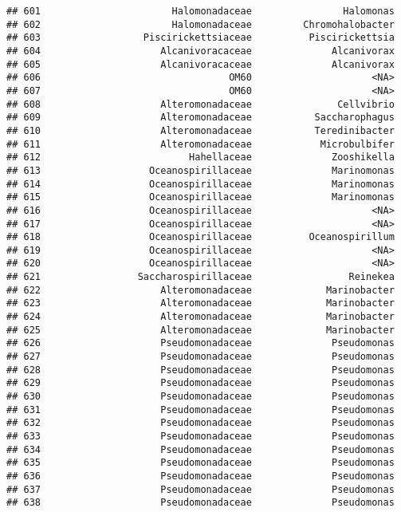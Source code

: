 \documentclass[
]{article}
\begin{document}
\begin{verbatim}
## 601                       Halomonadaceae                Halomonas
## 602                       Halomonadaceae         Chromohalobacter
## 603                  Piscirickettsiaceae          Piscirickettsia
## 604                     Alcanivoracaceae              Alcanivorax
## 605                     Alcanivoracaceae              Alcanivorax
## 606                                 OM60                     <NA>
## 607                                 OM60                     <NA>
## 608                     Alteromonadaceae               Cellvibrio
## 609                     Alteromonadaceae           Saccharophagus
## 610                     Alteromonadaceae           Teredinibacter
## 611                     Alteromonadaceae            Microbulbifer
## 612                          Hahellaceae              Zooshikella
## 613                   Oceanospirillaceae              Marinomonas
## 614                   Oceanospirillaceae              Marinomonas
## 615                   Oceanospirillaceae              Marinomonas
## 616                   Oceanospirillaceae                     <NA>
## 617                   Oceanospirillaceae                     <NA>
## 618                   Oceanospirillaceae          Oceanospirillum
## 619                   Oceanospirillaceae                     <NA>
## 620                   Oceanospirillaceae                     <NA>
## 621                 Saccharospirillaceae                 Reinekea
## 622                     Alteromonadaceae             Marinobacter
## 623                     Alteromonadaceae             Marinobacter
## 624                     Alteromonadaceae             Marinobacter
## 625                     Alteromonadaceae             Marinobacter
## 626                     Pseudomonadaceae              Pseudomonas
## 627                     Pseudomonadaceae              Pseudomonas
## 628                     Pseudomonadaceae              Pseudomonas
## 629                     Pseudomonadaceae              Pseudomonas
## 630                     Pseudomonadaceae              Pseudomonas
## 631                     Pseudomonadaceae              Pseudomonas
## 632                     Pseudomonadaceae              Pseudomonas
## 633                     Pseudomonadaceae              Pseudomonas
## 634                     Pseudomonadaceae              Pseudomonas
## 635                     Pseudomonadaceae              Pseudomonas
## 636                     Pseudomonadaceae              Pseudomonas
## 637                     Pseudomonadaceae              Pseudomonas
## 638                     Pseudomonadaceae              Pseudomonas

\end{verbatim}
\end{document}
